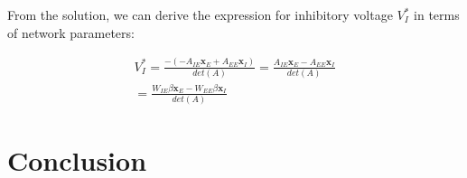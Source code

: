 \documentclass[10pt,twocolumn]{article}
\begin{document}
From the solution, we can derive the expression for
inhibitory voltage $V^\ast_I$ in terms of network parameters:

$$
    \begin{align*}
        V^\ast_I
        = \frac{-(- A_{IE}\textbf{x}_E + A_{EE}\textbf{x}_I)}{det(A)}
        = \frac{A_{IE}\textbf{x}_E - A_{EE}\textbf{x}_I}{det(A)}
        \\
        = \frac{W_{IE}\beta \textbf{x}_E - W_{EE}\beta \textbf{x}_I}{det(A)}
    \end{align*}
$$





\section{Conclusion}

\pagebreak
\pagebreak

\printbibliography
\end{document}
